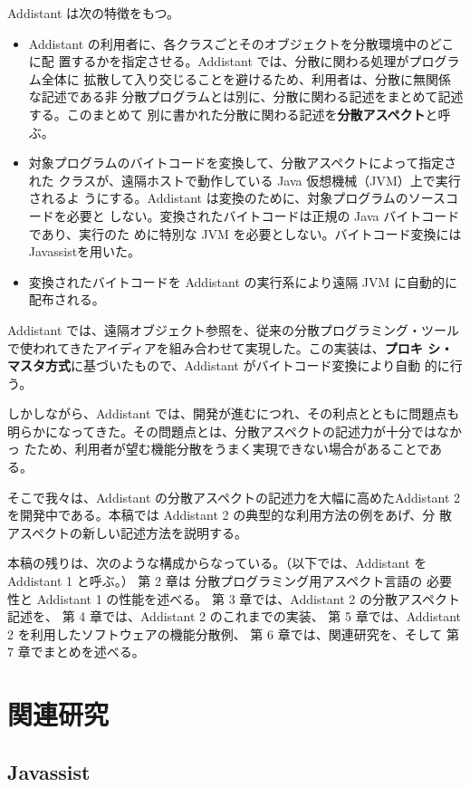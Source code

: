 \documentclass[12pt,twoside]{jbook}
\begin{document}
Addistant は次の特徴をもつ。
%
\begin{itemize}
\item
Addistant の利用者に、各クラスごとそのオブジェクトを分散環境中のどこに配
置するかを指定させる。Addistant では、分散に関わる処理がプログラム全体に
拡散して入り交じることを避けるため、利用者は、分散に無関係な記述である非
分散プログラムとは別に、分散に関わる記述をまとめて記述する。このまとめて
別に書かれた分散に関わる記述を{\bf{分散アスペクト}}と呼ぶ。
\item
対象プログラムのバイトコードを変換して、分散アスペクトによって指定された
クラスが、遠隔ホストで動作している Java 仮想機械（JVM）上で実行されるよ
うにする。Addistant は変換のために、対象プログラムのソースコードを必要と
しない。変換されたバイトコードは正規の Java バイトコードであり、実行のた
めに特別な JVM を必要としない。バイトコード変換には 
Javassistを用いた。
\item
変換されたバイトコードを Addistant の実行系により遠隔 JVM に自動的に
配布される。
\end{itemize}

Addistant では、遠隔オブジェクト参照を、従来の分散プログラミング・ツール
で使われてきたアイディアを組み合わせて実現した。この実装は、{\bf{プロキ
シ・マスタ方式}}に基づいたもので、Addistant がバイトコード変換により自動
的に行う。

しかしながら、Addistant では、開発が進むにつれ、その利点とともに問題点も
明らかになってきた。その問題点とは、分散アスペクトの記述力が十分ではなかっ
たため、利用者が望む機能分散をうまく実現できない場合があることである。

そこで我々は、Addistant の分散アスペクトの記述力を大幅に高めたAddistant
2を開発中である。本稿では Addistant 2 の典型的な利用方法の例をあげ、分
散アスペクトの新しい記述方法を説明する。

本稿の残りは、次のような構成からなっている。（以下では、Addistant を
Addistant 1 と呼ぶ。）
第 2 章は 分散プログラミング用アスペクト言語の
必要性と Addistant 1 の性能を述べる。
第 3 章では、Addistant 2 の分散アスペクト記述を、
第 4 章では、Addistant 2 のこれまでの実装、
第 5 章では、Addistant 2 を利用したソフトウェアの機能分散例、
第 6 章では、関連研究を、そして
第 7 章でまとめを述べる。

\chapter{関連研究}

\section{Javassist}
\end{document}
